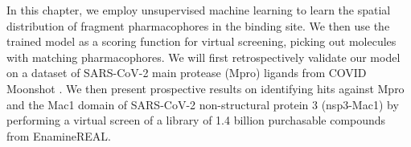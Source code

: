 In this chapter, we employ unsupervised machine learning to learn the spatial distribution of fragment pharmacophores in the binding site. We then use the trained model as a scoring function for virtual screening, picking out molecules with matching pharmacophores. We will first retrospectively validate our model on a dataset of SARS-CoV-2 main protease (Mpro) ligands from COVID Moonshot \cite{Moonshot2022}. We then present prospective results on identifying hits against Mpro and the Mac1 domain of SARS-CoV-2 non-structural protein 3 (nsp3-Mac1) by performing a virtual screen of a library of 1.4 billion purchasable compounds from EnamineREAL.


